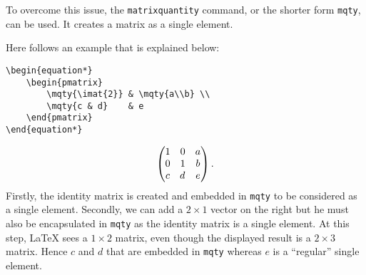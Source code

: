 		
		To overcome this issue, the \texttt{matrixquantity} command, or the shorter form \texttt{mqty}, can be used.
		It creates a matrix as a single element.
		
		Here follows an example that is explained below:
\begin{lstlisting}[language={[LaTeX]TeX}]
\begin{equation*}
	\begin{pmatrix}
		\mqty{\imat{2}} & \mqty{a\\b} \\
		\mqty{c & d}    & e
	\end{pmatrix}
\end{equation*}
\end{lstlisting}
		\begin{equation*}
			\begin{pmatrix}
				\mqty{\imat{2}} & \mqty{a\\b} \\
				\mqty{c & d}    & e
			\end{pmatrix}.
		\end{equation*}
		Firstly, the identity matrix is created and embedded in \texttt{mqty} to be considered as a single element.
		Secondly, we can add a $2 \times 1$ vector on the right but he must also be encapsulated in \texttt{mqty} as the identity matrix is a single element.
		At this step, \LaTeX{} sees a $1 \times 2$ matrix, even though the displayed result is a $2 \times 3$ matrix.
		Hence $c$ and $d$ that are embedded in \texttt{mqty} whereas $e$ is a \enquote{regular} single element.
		

